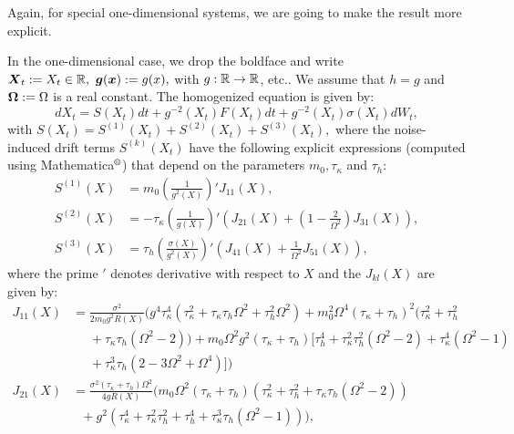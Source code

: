 Again, for special one-dimensional systems, we are going to make the result more explicit. 

\begin{corollary} \label{h_1dcase}
In the one-dimensional case,  we drop the boldface and write $\boldsymbol{X}_{t} := X_{t} \in \mathbb{R}, \ \boldsymbol{g}(\boldsymbol{x}) := g(x),$ with $g: \mathbb{R} \to \mathbb{R}$, etc.. We assume that $h=g$ and $\boldsymbol{\Omega} := \Omega $ is a real constant. The homogenized equation is given by:
\begin{equation} \label{onedlimitSDE}
dX_{t} = S(X_{t}) dt + g^{-2}(X_{t}) F(X_{t}) dt + g^{-2}(X_{t}) \sigma(X_{t}) dW_{t},
\end{equation}
with $S(X_{t}) = S^{(1)}(X_{t}) + S^{(2)}(X_{t}) + S^{(3)}(X_{t}),$ where the noise-induced drift terms $S^{(k)}(X_{t})$ have the following explicit expressions (computed using Mathematica$\textsuperscript{\textregistered}$) that depend on the parameters $m_{0}, \tau_{\kappa}$ and $\tau_{h}$:
\begin{align} 
S^{(1)}(X) &= m_{0}\left(\frac{1}{g^2(X)}\right)'J_{11}(X),\\ 
S^{(2)}(X) &= -\tau_{\kappa}\left(\frac{1}{g(X)}\right)' \left(J_{21}(X)+\left(1-\frac{2}{\Omega^2} \right) J_{31}(X) \right), \\
S^{(3)}(X) &= \tau_{h} \left( \frac{\sigma(X)}{g^2(X)}\right)' \left(J_{41}(X)+\frac{1}{\Omega^2} J_{51}(X) \right),   
\end{align}
where  the prime $'$ denotes derivative with respect to $X$ and the $J_{kl}(X)$ are given by:
\begin{align}
J_{11}(X) &= \frac{\sigma^2}{2m_{0} g^2 R(X)} \bigg( g^4 \tau_{\kappa}^4(\tau_{\kappa}^2+\tau_{\kappa} \tau_{h}\Omega^2 + \tau_{h}^2 \Omega^2) + m_{0}^2 \Omega^4 (\tau_{\kappa}+\tau_{h})^2 (\tau_{\kappa}^2 + \tau_{h}^2 \nonumber \\
&\ \ \ \ \ \ + \tau_{\kappa} \tau_{h} (\Omega^2-2)) + m_{0} \Omega^2 g^2 (\tau_{\kappa} + \tau_{h}) [\tau_{h}^4 + \tau_{\kappa}^2\tau_{h}^2 (\Omega^2-2)+\tau_{\kappa}^4(\Omega^2-1) \nonumber \\ 
&\ \ \ \ \ \ + \tau_{\kappa}^3 \tau_{h}(2-3\Omega^2+\Omega^4)] \bigg) \\
J_{21}(X) &= \frac{\sigma^2(\tau_{\kappa} + \tau_{h}) \Omega^2}{4g R(X)} \bigg( m_{0}\Omega^2 (\tau_{\kappa} + \tau_{h})(\tau_{\kappa}^2 + \tau_{h}^2 + \tau_{\kappa} \tau_{h} (\Omega^2-2)) \nonumber \\ 
&\ \ \ + g^2(\tau_{\kappa}^4+\tau_{\kappa}^2 \tau_{h}^2 + \tau_{h}^4+\tau_{\kappa}^3 \tau_{h}(\Omega^2-1))   \bigg),  \\

\end{align}
\end{corollary}
